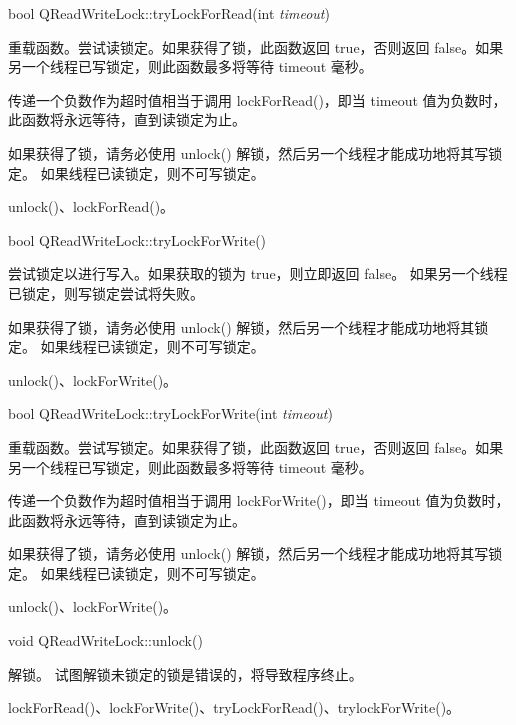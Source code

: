 bool QReadWriteLock::tryLockForRead(int \emph{timeout})

重载函数。尝试读锁定。如果获得了锁，此函数返回 true，否则返回 false。如果另一个线程已写锁定，则此函数最多将等待 timeout 毫秒。

\begin{notice}
传递一个负数作为超时值相当于调用 lockForRead()，即当 timeout 值为负数时，此函数将永远等待，直到读锁定为止。
\end{notice} 

如果获得了锁，请务必使用 unlock() 解锁，然后另一个线程才能成功地将其写锁定。
如果线程已读锁定，则不可写锁定。

\begin{notice}[另请参阅]
unlock()、lockForRead()。
\end{notice} 

bool QReadWriteLock::tryLockForWrite()

尝试锁定以进行写入。如果获取的锁为 true，则立即返回 false。
如果另一个线程已锁定，则写锁定尝试将失败。

如果获得了锁，请务必使用 unlock() 解锁，然后另一个线程才能成功地将其锁定。
如果线程已读锁定，则不可写锁定。

\begin{notice}[另请参阅]
unlock()、lockForWrite()。
\end{notice}

bool QReadWriteLock::tryLockForWrite(int \emph{timeout})

重载函数。尝试写锁定。如果获得了锁，此函数返回 true，否则返回 false。如果另一个线程已写锁定，则此函数最多将等待 timeout 毫秒。

\begin{notice}
传递一个负数作为超时值相当于调用 lockForWrite()，即当 timeout 值为负数时，此函数将永远等待，直到读锁定为止。
\end{notice}

如果获得了锁，请务必使用 unlock() 解锁，然后另一个线程才能成功地将其写锁定。
如果线程已读锁定，则不可写锁定。

\begin{notice}[另请参阅]
unlock()、lockForWrite()。
\end{notice}

void QReadWriteLock::unlock()

解锁。 试图解锁未锁定的锁是错误的，将导致程序终止。
 
\begin{notice}[另请参阅]
lockForRead()、lockForWrite()、tryLockForRead()、trylockForWrite()。
\end{notice}
